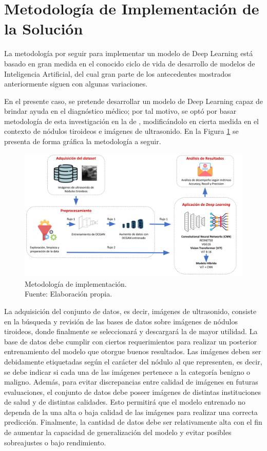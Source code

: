 \section{Metodología de Implementación de la Solución}
La metodología por seguir para implementar un modelo de Deep Learning está basado en gran medida en el conocido ciclo de vida de desarrollo de modelos de Inteligencia Artificial, del cual gran parte de los antecedentes mostrados anteriormente siguen con algunas variaciones. 

En el presente caso, se pretende desarrollar un modelo de Deep Learning capaz de brindar ayuda en el diagnóstico médico; por tal motivo, se optó por basar metodología de esta investigación en la de \cite{pr_monroy2021disvc}, modificándolo en cierta medida en el contexto de nódulos tiroideos e imágenes de ultrasonido. En la Figura \ref{3:fig301} se presenta de forma gráfica la metodología a seguir.

\begin{figure}[H]
	\begin{center}
		\includegraphics[width=1.00\textwidth]{3/figures/metod_classthy1.png}
		\caption[Metodología de implementación]{Metodología de implementación. \\
		Fuente: Elaboración propia.}
		\label{3:fig301}
	\end{center}
\end{figure}

La adquisición del conjunto de datos, es decir, imágenes de ultrasonido, consiste en la búsqueda y revisión de las bases de datos sobre imágenes de nódulos tiroideos, donde finalmente se seleccionará y descargará la de mayor utilidad. La base de datos debe cumplir con ciertos requerimientos para realizar un posterior entrenamiento del modelo que otorgue buenos resultados. Las imágenes deben ser debidamente etiquetadas según el carácter del nódulo al que representen, es decir, se debe indicar si cada una de las imágenes pertenece a la categoría benigno o maligno. Además, para evitar discrepancias entre calidad de imágenes en futuras evaluaciones, el conjunto de datos debe poseer imágenes de distintas instituciones de salud y de distintas calidades. Esto permitirá que el modelo entrenado no dependa de la una alta o baja calidad de las imágenes para realizar una correcta predicción. Finalmente, la cantidad de datos debe ser relativamente alta con el fin de aumentar la capacidad de generalización del modelo y evitar posibles sobreajustes o bajo rendimiento.  

